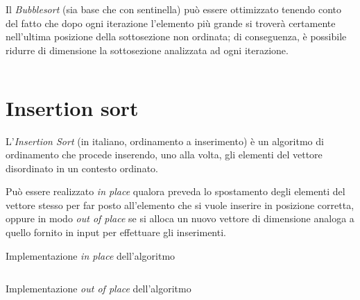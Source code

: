   Il \textit{Bubblesort} (sia base che con sentinella) può essere ottimizzato tenendo conto del fatto che
  dopo ogni iterazione l'elemento più grande si troverà certamente nell'ultima posizione della sottosezione
  non ordinata; di conseguenza, è possibile ridurre di dimensione la sottosezione analizzata ad ogni iterazione.

  \inputminted[firstline=20,lastline=36]{cpp}{./src/main/cpp/Bubble.cpp}

  \clearpage

  \section{Insertion sort}\label{sec:insertion}

  L'\textit{Insertion Sort} (in italiano, ordinamento a inserimento) è un algoritmo di ordinamento
  che procede inserendo, uno alla volta, gli elementi del vettore disordinato in un contesto ordinato.

  Può essere realizzato \textit{in place} qualora preveda lo spostamento degli elementi del vettore stesso
  per far posto all'elemento che si vuole inserire in posizione corretta, oppure in modo \textit{out of place}
  se si alloca un nuovo vettore di dimensione analoga a quello fornito in input per effettuare gli inserimenti.

  \begin{listing}[H]
    \caption{Implementazione \textit{in place} dell'algoritmo}
    \inputminted[firstline=27,lastline=43]{cpp}{./src/main/cpp/Insertion.cpp}
    \label{lst:insertion:in}
  \end{listing}

  \clearpage

  \begin{listing}[H]
    \caption{Implementazione \textit{out of place} dell'algoritmo}
    \inputminted[firstline=3,lastline=26]{cpp}{./src/main/cpp/Insertion.cpp}
    \label{lst:insertion:out}
  \end{listing}



